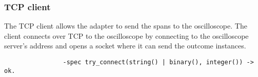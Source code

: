         \subsubsection{TCP client}
            The TCP client allows the adapter to send the spans to the oscilloscope.
            The client connects over TCP to the oscilloscope by connecting to the oscilloscope server's address and opens a socket where it can send the outcome instances.
            \begin{verbatim}
                -spec try_connect(string() | binary(), integer()) -> ok.
            \end{verbatim}
